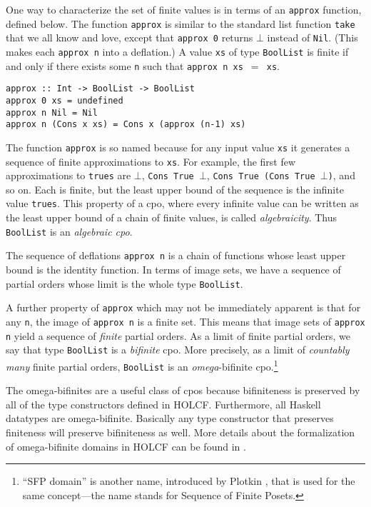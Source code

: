 \documentclass{llncs}
\begin{document}
One way to characterize the set of finite values is in terms of an
\texttt{approx} function, defined below.  The function \texttt{approx}
is similar to the standard list function \texttt{take} that we all
know and love, except that \texttt{approx 0} returns $\bot$ instead of
\texttt{Nil}.  (This makes each \texttt{approx n} into a deflation.)
A value \texttt{xs} of type \texttt{BoolList} is finite if and only if
there exists some \texttt{n} such that \texttt{approx n xs $=$ xs}.
\begin{verbatim}
approx :: Int -> BoolList -> BoolList
approx 0 xs = undefined
approx n Nil = Nil
approx n (Cons x xs) = Cons x (approx (n-1) xs)
\end{verbatim}

The function \texttt{approx} is so named because for any input value
\texttt{xs} it generates a sequence of finite approximations to
\texttt{xs}.  For example, the first few approximations to
\texttt{trues} are $\bot$, \texttt{Cons True $\bot$}, \texttt{Cons
  True (Cons True $\bot$)}, and so on.  Each is finite, but the least
upper bound of the sequence is the infinite value \texttt{trues}.
This property of a cpo, where every infinite value can be written as
the least upper bound of a chain of finite values, is called
\emph{algebraicity}.  Thus \texttt{BoolList} is an \emph{algebraic
  cpo}.

The sequence of deflations \texttt{approx n} is a chain of functions
whose least upper bound is the identity function.  In terms of image
sets, we have a sequence of partial orders whose limit is the whole
type \texttt{BoolList}.

A further property of \texttt{approx} which may not be immediately
apparent is that for any \texttt{n}, the image of \texttt{approx n} is
a finite set.  This means that image sets of \texttt{approx n} yield a
sequence of \emph{finite} partial orders.  As a limit of finite
partial orders, we say that type \texttt{BoolList} is a
\emph{bifinite} cpo.  More precisely, as a limit of \emph{countably
  many} finite partial orders, \texttt{BoolList} is an
\emph{omega}-bifinite cpo.\footnote{``SFP domain'' is another name,
introduced by Plotkin \cite{plotkin76powerdomain}, that is used for
the same concept---the name stands for Sequence of Finite Posets.}

The omega-bifinites are a useful class of cpos because bifiniteness is
preserved by all of the type constructors defined in HOLCF.
Furthermore, all Haskell datatypes are omega-bifinite.  Basically any
type constructor that preserves finiteness will preserve bifiniteness
as well.  More details about the formalization of omega-bifinite
domains in HOLCF can be found in \cite{huffman08powerdomain}.
\end{document}
